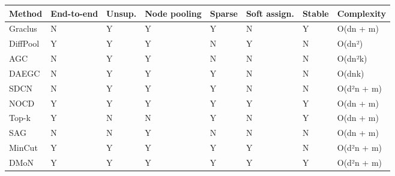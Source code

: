 \documentclass[
]{article}
\begin{document}
\begin{longtable}[]{@{}
  >{\raggedright\arraybackslash}p{}
  >{\raggedright\arraybackslash}p{}
  >{\raggedright\arraybackslash}p{}
  >{\raggedright\arraybackslash}p{}
  >{\raggedright\arraybackslash}p{}
  >{\raggedright\arraybackslash}p{}
  >{\raggedright\arraybackslash}p{}
  >{\raggedright\arraybackslash}p{}@{}}
\toprule\noalign{}
\begin{minipage}[b]{\linewidth}\raggedright
Method
\end{minipage} & \begin{minipage}[b]{\linewidth}\raggedright
End-to-end
\end{minipage} & \begin{minipage}[b]{\linewidth}\raggedright
Unsup.
\end{minipage} & \begin{minipage}[b]{\linewidth}\raggedright
Node pooling
\end{minipage} & \begin{minipage}[b]{\linewidth}\raggedright
Sparse
\end{minipage} & \begin{minipage}[b]{\linewidth}\raggedright
Soft assign.
\end{minipage} & \begin{minipage}[b]{\linewidth}\raggedright
Stable
\end{minipage} & \begin{minipage}[b]{\linewidth}\raggedright
Complexity
\end{minipage} \\
\midrule\noalign{}
\endhead
\bottomrule\noalign{}
\endlastfoot
Graclus & N & Y & Y & Y & N & Y & O(dn + m) \\
DiffPool & Y & Y & Y & N & Y & N & O(dn²) \\
AGC & N & Y & Y & N & N & N & O(dn²k) \\
DAEGC & N & Y & Y & Y & N & N & O(dnk) \\
SDCN & N & Y & Y & Y & N & N & O(d²n + m) \\
NOCD & Y & Y & Y & Y & Y & Y & O(dn + m) \\
Top-k & Y & N & N & Y & N & Y & O(dn + m) \\
SAG & N & N & Y & N & N & N & O(dn + m) \\
MinCut & Y & Y & Y & Y & Y & N & O(d²n + m) \\
DMoN & Y & Y & Y & Y & Y & Y & O(d²n + m) \\
\end{longtable}
\end{document}
